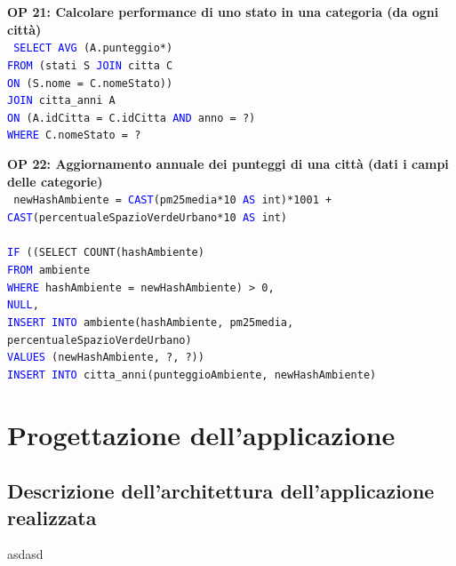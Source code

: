 \documentclass[a4paper,12pt]{report}
\begin{document}
            \noindent
            \textbf{OP 21: Calcolare performance di uno stato in una categoria (da ogni città)} \\
            \texttt{
                \textcolor{blue}{SELECT AVG} (A.punteggio*) \\
                \textcolor{blue}{FROM} (stati S \textcolor{blue}{JOIN} citta C \\
                \textcolor{blue}{ON} (S.nome = C.nomeStato)) \\
                \textcolor{blue}{JOIN} citta\_anni A \\
                \textcolor{blue}{ON} (A.idCitta = C.idCitta \textcolor{blue}{AND} anno = ?) \\
                \textcolor{blue}{WHERE} C.nomeStato = ? \\
            }

            \noindent
            \textbf{OP 22: Aggiornamento annuale dei punteggi di una città (dati i campi delle categorie)} \\
            \texttt{
                newHashAmbiente = \textcolor{blue}{CAST}(pm25media*10 \textcolor{blue}{AS} int)*1001 + \textcolor{blue}{CAST}(percentualeSpazioVerdeUrbano*10 \textcolor{blue}{AS} int) \\ \\
                \textcolor{blue}{IF} ((SELECT COUNT(hashAmbiente) \\
                \textcolor{blue}{FROM} ambiente \\
                \textcolor{blue}{WHERE} hashAmbiente = newHashAmbiente) > 0,  \\
                \textcolor{blue}{NULL},  \\
                \textcolor{blue}{INSERT INTO} ambiente(hashAmbiente, pm25media, percentualeSpazioVerdeUrbano) \\
                \textcolor{blue}{VALUES} (newHashAmbiente, ?, ?)) \\
                \textcolor{blue}{INSERT INTO} citta\_anni(punteggioAmbiente, newHashAmbiente) \\
            }

        \chapter{Progettazione dell'applicazione}
            
    	\section{Descrizione dell'architettura dell'applicazione realizzata}
        	asdasd
 
\end{document}
